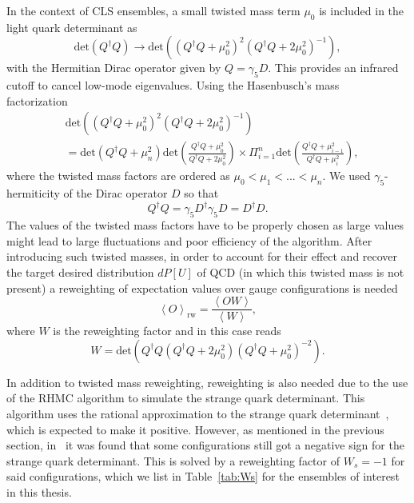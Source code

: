 In the context of CLS ensembles, a small twisted mass term $\mu_0$ is included in the light quark determinant as~\citep{Luscher:2012av}
\begin{equation}
\textrm{det}\left(Q^{\dagger}Q\right)\rightarrow\textrm{det}\left(\left(Q^{\dagger}Q+\mu_0^2\right)^2\left(Q^{\dagger}Q+2\mu_0^2\right)^{-1}\right),
\end{equation}
with the Hermitian Dirac operator given by $Q=\gamma_5D$. This provides an infrared cutoff to cancel low-mode eigenvalues. Using the Hasenbusch’s mass factorization~\citep{Hasenbusch:2001ne}
\begin{align}
&\textrm{det}\left(\left(Q^{\dagger}Q+\mu_0^2\right)^2\left(Q^{\dagger}Q+2\mu_0^2\right)^{-1}\right) \\ 
&=\textrm{det}\left(Q^{\dagger}Q+\mu_{n}^2\right)\textrm{det}\left(\frac{Q^{\dagger}Q+\mu_{0}^2}{Q^{\dagger}Q+2\mu_0^2}\right)\times\Pi_{i=1}^{n}\textrm{det}\left(\frac{Q^{\dagger}Q+\mu_{i-1}^2}{Q^{\dagger}Q+\mu_i^2}\right),
\end{align}
where the twisted mass factors are ordered as $\mu_0<\mu_1<...<\mu_{n}$. We used $\gamma_5$-hermiticity of the Dirac operator $D$ so that
\begin{equation}
Q^{\dagger}Q=\gamma_5D^{\dagger}\gamma_5D=D^{\dagger}D.
\end{equation}
The values of the twisted mass factors have to be properly chosen as large values might lead to large fluctuations and poor efficiency of the algorithm. After introducing such twisted masses, in order to account for their effect and recover the target desired distribution $dP[U]$ of QCD (in which this twisted mass is not present) a reweighting of expectation values over gauge configurations is needed
\begin{equation}
\left<O\right>_{\textrm{rw}}=\frac{\left<OW\right>}{\left<W\right>},
\end{equation}
where $W$ is the reweighting factor and in this case reads
\begin{equation}
W=\textrm{det}\left(Q^{\dagger}Q\left(Q^{\dagger}Q+2\mu_0^2\right)\left(Q^{\dagger}Q+\mu_0^2\right)^{-2}\right).
\end{equation}

In addition to twisted mass reweighting, reweighting is also needed due to the use of the RHMC algorithm to simulate the strange quark determinant. This algorithm uses the rational approximation to the strange quark determinant~\citep{RHMC}, which is expected to make it positive. However, as mentioned in the previous section, in~\citep{Mohler:2020txx} it was found that some configurations still got a negative sign for the strange quark determinant. This is solved by a reweighting factor of $W_s=-1$ for said configurations, which we list in Table~\ref{tab:Ws} for the ensembles of interest in this thesis.

